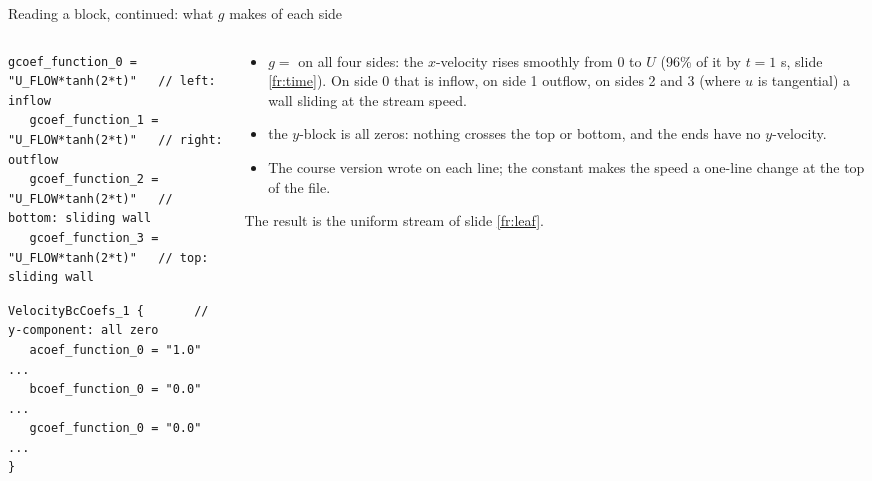 \documentclass[aspectratio=169,11pt]{beamer}
\begin{document}
\begin{frame}[fragile]{Reading a block, continued: what $g$ makes of each side}
\label{fr:readblock2}
\begin{columns}[T,onlytextwidth]
\begin{column}{0.5\textwidth}
\begin{lstlisting}[style=input]
   gcoef_function_0 = "U_FLOW*tanh(2*t)"   // left:   inflow
   gcoef_function_1 = "U_FLOW*tanh(2*t)"   // right:  outflow
   gcoef_function_2 = "U_FLOW*tanh(2*t)"   // bottom: sliding wall
   gcoef_function_3 = "U_FLOW*tanh(2*t)"   // top:    sliding wall
\end{lstlisting}
\begin{lstlisting}[style=input]
VelocityBcCoefs_1 {       // y-component: all zero
   acoef_function_0 = "1.0"   ...
   bcoef_function_0 = "0.0"   ...
   gcoef_function_0 = "0.0"   ...
}
\end{lstlisting}
\end{column}
\begin{column}{0.48\textwidth}
\small
\begin{itemize}
  \item $g = $ on all four sides: the $x$-velocity rises smoothly from $0$ to $U$ (96\% of it by $t = 1$ s, slide \ref{fr:time}). On side 0 that is inflow, on side 1 outflow, on sides 2 and 3 (where $u$ is tangential) a wall sliding at the stream speed.
  \item the $y$-block is all zeros: nothing crosses the top or bottom, and the ends have no $y$-velocity.
  \item The course version wrote  on each line; the constant makes the speed a one-line change at the top of the file.
\end{itemize}
\small The result is the uniform stream of slide \ref{fr:leaf}.
\end{column}
\end{columns}
\end{frame}
\end{document}
